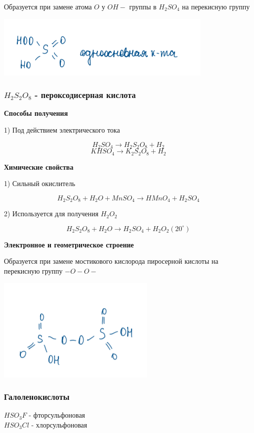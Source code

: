 \documentclass[14pt,a4paper]{scrartcl}
\begin{document}
Образуется при замене атома $O$ у $OH-$ группы в $H_2SO_4$ на перекисную группу

\includegraphics{7v9.png}

\subsubsection{$H_2S_2O_8$ - пероксодисерная кислота}

\textbf{Способы получения}

1) Под действием электрического тока

$$H_2SO_4 \rightarrow H_2S_2O_8 + H_2$$
$$KHSO_4 \rightarrow K_2S_2O_8 + H_2$$

\textbf{Химические свойства}

1) Сильный окислитель

$$H_2S_2O_8 + H_2O + MnSO_4 \rightarrow HMnO_4 + H_2SO_4$$

2) Используется для получения $H_2O_2$

$$H_2S_2O_8 + H_2O \rightarrow H_2SO_4 + H_2O_2 (20^{\circ})$$

\textbf{Электронное и геометрическое строение}

Образуется при замене мостикового кислорода пиросерной кислоты на перекисную группу $-O-O-$

\includegraphics{7v10.png}

\subsubsection{Галоленокислоты}

$HSO_3F$ - фторсульфоновая\\
$HSO_3Cl$ - хлорсульфоновая
\end{document}

